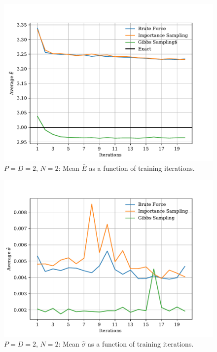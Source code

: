\documentclass[%
oneside,                 %
final,                   %
10pt]{article}
\begin{document}
\begin{appendices}
\begin{figure}[H]
        \centering 
         \includegraphics[scale=0.7]{../Results/sim_13/n2_training_interacting.pdf} 
        \caption{$P=D=2$, $N=2$: Mean $\bar E$ as a function of training iterations.}
        \label{fig:interacting_n2_energy}
\end{figure}  


\begin{figure}[H]
        \centering 
         \includegraphics[scale=0.7]{../Results/sim_13/n2_error_interacting.pdf} 
        \caption{$P=D=2$, $N=2$: Mean $\hat \sigma$ as a function of training iterations.}
        \label{fig:interacting_n2_sigma}   
\end{figure}  


\end{appendices}
\end{document}
